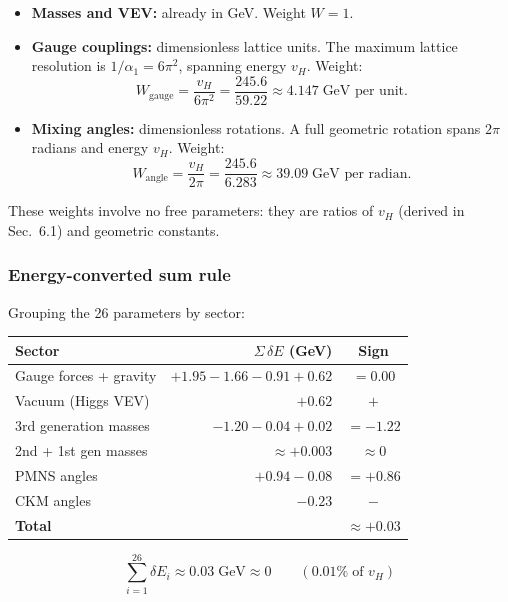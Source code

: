 \documentclass[12pt]{article}
\theoremstyle{remark}
\theoremstyle{definition}
\begin{document}
\begin{itemize}
\item \textbf{Masses and VEV:} already in GeV. Weight $W = 1$.
\item \textbf{Gauge couplings:} dimensionless lattice units. The maximum lattice resolution is $1/\alpha_1 = 6\pi^2$, spanning energy $v_H$. Weight:
\begin{equation}
W_\text{gauge} = \frac{v_H}{6\pi^2} = \frac{245.6}{59.22} \approx 4.147\;\text{GeV per unit}.
\end{equation}
\item \textbf{Mixing angles:} dimensionless rotations. A full geometric rotation spans $2\pi$ radians and energy $v_H$. Weight:
\begin{equation}
W_\text{angle} = \frac{v_H}{2\pi} = \frac{245.6}{6.283} \approx 39.09\;\text{GeV per radian}.
\end{equation}
\end{itemize}

These weights involve no free parameters: they are ratios of $v_H$ (derived in Sec.~6.1) and geometric constants.

\subsubsection{Energy-converted sum rule}

Grouping the 26 parameters by sector:

\begin{center}
\begin{tabular}{lrc}
\hline
Sector & $\Sigma\,\delta E$ (GeV) & Sign \\
\hline
Gauge forces + gravity & $+1.95 - 1.66 - 0.91 + 0.62$ & $= 0.00$ \\
Vacuum (Higgs VEV) & $+0.62$ & $+$ \\
3rd generation masses & $-1.20 - 0.04 + 0.02$ & $= -1.22$ \\
2nd + 1st gen masses & $\approx +0.003$ & $\approx 0$ \\
PMNS angles & $+0.94 - 0.08$ & $= +0.86$ \\
CKM angles & $-0.23$ & $-$ \\
\hline
\textbf{Total} & & $\approx \mathbf{+0.03}$ \\
\hline
\end{tabular}
\end{center}

\begin{equation}
\boxed{\sum_{i=1}^{26} \delta E_i \approx 0.03\;\text{GeV} \approx 0 \qquad (0.01\%\;\text{of } v_H)}
\end{equation}
\end{document}
